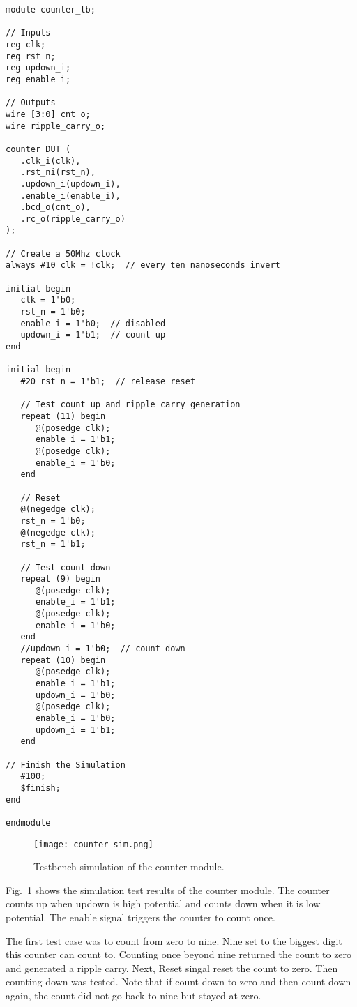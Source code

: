 \begin{verbatim}
module counter_tb;

// Inputs
reg clk;
reg rst_n;
reg updown_i;
reg enable_i;

// Outputs
wire [3:0] cnt_o;
wire ripple_carry_o;

counter DUT (
   .clk_i(clk),
   .rst_ni(rst_n),
   .updown_i(updown_i),
   .enable_i(enable_i),
   .bcd_o(cnt_o),
   .rc_o(ripple_carry_o)
);

// Create a 50Mhz clock
always #10 clk = !clk;  // every ten nanoseconds invert

initial begin
   clk = 1'b0;
   rst_n = 1'b0;
   enable_i = 1'b0;  // disabled
   updown_i = 1'b1;  // count up
end

initial begin
   #20 rst_n = 1'b1;  // release reset

   // Test count up and ripple carry generation
   repeat (11) begin
      @(posedge clk);
      enable_i = 1'b1;
      @(posedge clk);
      enable_i = 1'b0;
   end

   // Reset
   @(negedge clk);
   rst_n = 1'b0;
   @(negedge clk);
   rst_n = 1'b1;

   // Test count down
   repeat (9) begin
      @(posedge clk);
      enable_i = 1'b1;
      @(posedge clk);
      enable_i = 1'b0;
   end
   //updown_i = 1'b0;  // count down
   repeat (10) begin
      @(posedge clk);
      enable_i = 1'b1;
      updown_i = 1'b0;
      @(posedge clk);
      enable_i = 1'b0;
      updown_i = 1'b1;
   end

// Finish the Simulation
   #100;
   $finish;
end

endmodule
\end{verbatim}

\begin{figure}[htbp]
   \centering
   \texttt{[image: counter\_sim.png]}
   \caption{Testbench simulation of the counter module.}
   \label{fig:counter_sim}
\end{figure}

Fig.~\ref{fig:counter_sim} shows the simulation test results of the counter module. The counter counts up when updown is high potential and counts down when it is low potential. The enable signal triggers the counter to count once.

The first test case was to count from zero to nine. Nine set to the biggest digit this counter can count to. Counting once beyond nine returned the count to zero and generated a ripple carry. Next, Reset singal reset the count to zero. Then counting down was tested. Note that if count down to zero and then count down again, the count did not go back to nine but stayed at zero.
